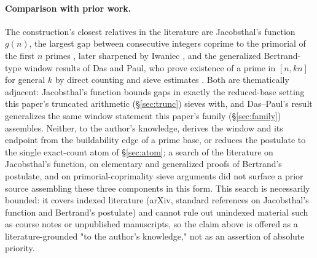 \documentclass[11pt,a4paper]{amsart}
\theoremstyle{plain}
\theoremstyle{definition}
\theoremstyle{plain}
\theoremstyle{remark}
\begin{document}
\paragraph{Comparison with prior work.}
The construction's closest relatives in the literature are Jacobsthal's function $g(n)$,
the largest gap between consecutive integers coprime to the primorial of the first $n$
primes \cite{jacobsthal1961}, later sharpened by Iwaniec \cite{iwaniec1978}, and the
generalized Bertrand-type window results of Das and Paul, who prove existence of a prime
in $[n,kn]$ for general $k$ by direct counting and sieve estimates \cite{daspaul2019}. Both
are thematically adjacent: Jacobsthal's function bounds gaps in exactly the reduced-base
setting this paper's truncated arithmetic (\S\ref{sec:trunc}) sieves with, and Das--Paul's
result generalizes the same window statement this paper's family (\S\ref{sec:family})
assembles. Neither, to the author's knowledge, derives the window and its endpoint from the
buildability edge of a prime base, or reduces the postulate to the single exact-count atom
of \S\ref{sec:atom}; a search of the literature on Jacobsthal's function, on elementary and
generalized proofs of Bertrand's postulate, and on primorial-coprimality sieve arguments did
not surface a prior source assembling these three components in this form. This search is
necessarily bounded: it covers indexed literature (arXiv, standard references on
Jacobsthal's function and Bertrand's postulate) and cannot rule out unindexed material such
as course notes or unpublished manuscripts, so the claim above is offered as a
literature-grounded "to the author's knowledge," not as an assertion of absolute priority.
\end{document}
